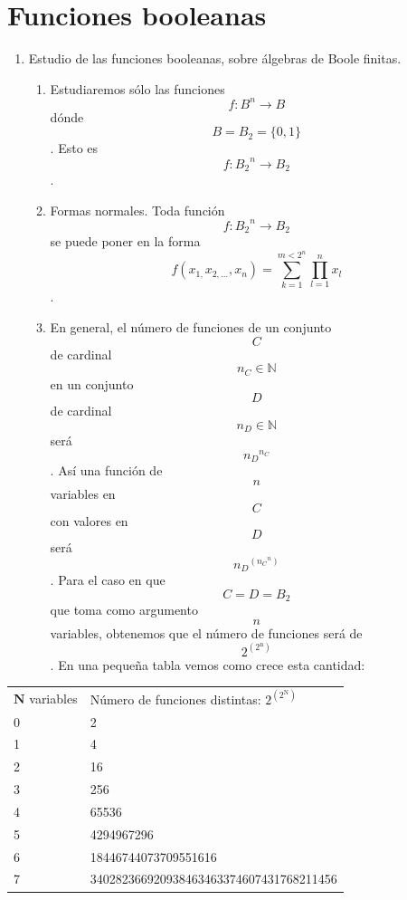 \chapter{Funciones booleanas}

\begin{enumerate}
\def\labelenumi{\arabic{enumi}.}
\item
  Estudio de las funciones booleanas, sobre álgebras de Boole finitas.

  \begin{enumerate}
  \def\labelenumii{\arabic{enumii}.}
  \tightlist
  \item
    Estudiaremos sólo las funciones \[f:{B^{n}\rightarrow B}\] dónde
    \[{B = B_{2}} = {\{ 0,1\}}\]. Esto es
    \[f:{{B_{2}}^{n}\rightarrow B_{2}}\].
  \item
    Formas normales. Toda función \[f:{{B_{2}}^{n}\rightarrow B_{2}}\]
    se puede poner en la forma
    \[f{{({x_{1,}x_{2,...},x_{n}})} = {\sum\limits_{k = 1}^{m < 2^{n}}{\prod\limits_{l = 1}^{n}x_{l}}}}\].
  \item
    En general, el número de funciones de un conjunto \[C\]de cardinal
    \[n_{C} \in \mathbb{N}\] en un conjunto \[D\]de cardinal
    \[n_{D} \in \mathbb{N}\]será \[{n_{D}}^{n_{C}}\]. Así una función de
    \[n\] variables en \[C\]con valores en \[D\]será
    \[{n_{D}}^{({n_{C}}^{n})}\]. Para el caso en que
    \[{C = D} = B_{2}\]que toma como argumento\[n\] variables, obtenemos
    que el número de funciones será de
    \[2^{(2^{\mathbf{\mathrm{n}}})}\]. En una pequeña tabla vemos como
    crece esta cantidad:
  \end{enumerate}
\end{enumerate}

{\def\LTcaptype{none} %
\begin{longtable}[]{@{}ll@{}}
\toprule\noalign{}
\endhead
\bottomrule\noalign{}
\endlastfoot
\(\mathbf{N}\) variables & Número de funciones distintas:
\(2^{(2^{\mathbf{\mathrm{N}}})}\) \\
0 & 2 \\
1 & 4 \\
2 & 16 \\
3 & 256 \\
4 & 65536 \\
5 & 4294967296 \\
6 & 18446744073709551616 \\
7 & 340282366920938463463374607431768211456 \\
\end{longtable}
}

